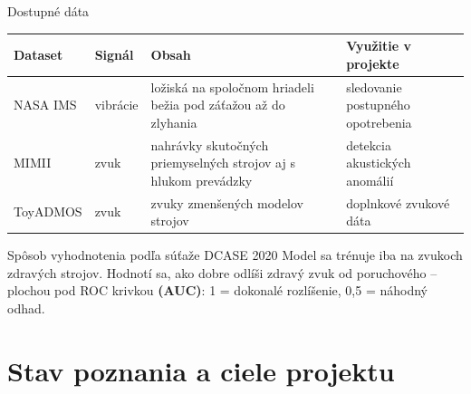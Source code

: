 \documentclass[aspectratio=169,11pt]{beamer}
\newcommand{\presenter}{}
\newcommand{\setpresenter}[1]{\renewcommand{\presenter}{#1}}
\begin{document}
\begin{frame}{Dostupné dáta}
  \small
  \begin{tabularx}{\textwidth}{@{}l l >{\raggedright\arraybackslash}X >{\raggedright\arraybackslash}X@{}}
    \toprule
    \textbf{Dataset} & \textbf{Signál} & \textbf{Obsah} & \textbf{Využitie v projekte} \\
    \midrule
    NASA IMS \cite{nasa} & vibrácie & 4 ložiská na spoločnom hriadeli bežia pod záťažou až do zlyhania & sledovanie postupného opotrebenia \\
    \addlinespace
    MIMII \cite{mimii} & zvuk & nahrávky skutočných priemyselných strojov aj s hlukom prevádzky & detekcia akustických anomálií \\
    \addlinespace
    ToyADMOS \cite{toyadmos} & zvuk & zvuky zmenšených modelov strojov & doplnkové zvukové dáta \\
    \bottomrule
  \end{tabularx}
  \normalsize
  \smallskip
  \begin{exampleblock}{Spôsob vyhodnotenia podľa súťaže DCASE 2020 \cite{dcase}}
    Model sa trénuje iba na zvukoch zdravých strojov. Hodnotí sa, ako dobre odlíši zdravý zvuk od poruchového -- plochou pod ROC krivkou \textbf{(AUC)}: 1 = dokonalé rozlíšenie, 0,5 = náhodný odhad.
  \end{exampleblock}
\end{frame}

\setpresenter{Pavel Ustimenko}
\section{Stav poznania a ciele projektu}
\end{document}
